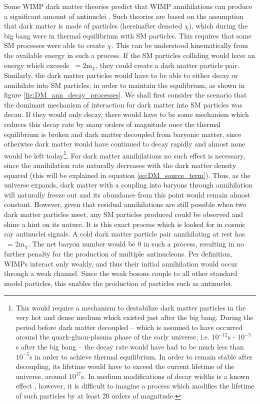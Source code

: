 Some WIMP dark matter theories predict that WIMP annihilations can produce a significant amount of antinuclei \cite{Ibarra:2012cc, Korsmeier:2017xzj, cookbook}. Such theories are based on the assumption that dark matter is made of particles (hereinafter denoted $\chi$), which during the big bang were in thermal equilibrium with SM particles. This requires that some SM processes were able to create $\chi$. This can be understood kinematically from the available energy in such a process. If the SM particles colliding would have an energy which exceeds \Vs\ = $2\mathrm{m}_\chi$, they could create a dark matter particle pair. Similarly, the dark matter particles would have to be able to either decay or annihilate into SM particles, in order to maintain the equilibrium, as shown in figure \ref{fig:DM_ann_decay_processes}. We shall first consider the scenario that the dominant mechanism of interaction for dark matter into SM particles was decau. If they would only decay, there would have to be some mechanism which reduces this decay rate by many orders of magnitude once the thermal equilibrium is broken and dark matter decoupled from baryonic matter, since otherwise dark matter would have continued to decay rapidly and almost none would be left today\footnote{This would require a mechanism to destabilize dark matter particles in the very hot and dense medium which existed just after the big bang. During the period before dark matter decoupled -- which is assumed to have occurred around the quark-gluon-plasma phase of the early universe, i.e. $10^{-12}$s - $10^{-5}$ s after the big bang -- the decay rate would have had to be much less than $10^{-5}$s in order to achieve thermal equilibrium. In order to remain stable after decoupling, its lifetime would have to exceed the current lifetime of the universe, around $10^{17}$s. In medium modifications of decay widths is a known effect \cite{Riek_2010}, however, it is difficult to imagine a process which modifies the lifetime of such particles by at least 20 orders of magnitude.}. For dark matter annihilations no such effect is necessary, since the annihilation rate naturally decreases with the dark matter density squared (this will be explained in equation \ref{eq:DM_source_term}). Thus, as the universe expands, dark matter with a coupling into baryons through annihilation will naturally freeze out and its abundance from this point would remain almost constant. However, given that residual annihilations are still possible when two dark matter particles meet, any SM particles produced could be observed and shine a hint on its nature. It is this exact process which is looked for in cosmic ray antinuclei signals. A cold dark matter particle pair annihilating at rest has \Vs\ = $2\mathrm{m}_\chi$. The net baryon number would be 0 in such a process, resulting in no further penalty for the production of multiple antinucleons. Per definition, WIMPs interact only weakly, and thus their initial annihilation would occur through a weak channel. Since the weak bosons couple to all other standard model particles, this enables the production of particles such as antinuclei. \\



